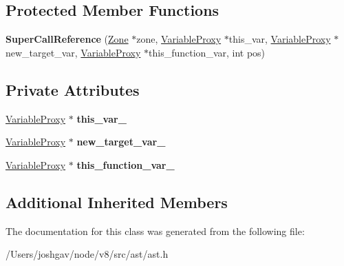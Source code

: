\subsection*{Protected Member Functions}
\begin{DoxyCompactItemize}
\item 
{\bfseries Super\+Call\+Reference} (\hyperlink{classv8_1_1internal_1_1_zone}{Zone} $\ast$zone, \hyperlink{classv8_1_1internal_1_1_variable_proxy}{Variable\+Proxy} $\ast$this\+\_\+var, \hyperlink{classv8_1_1internal_1_1_variable_proxy}{Variable\+Proxy} $\ast$new\+\_\+target\+\_\+var, \hyperlink{classv8_1_1internal_1_1_variable_proxy}{Variable\+Proxy} $\ast$this\+\_\+function\+\_\+var, int pos)\hypertarget{classv8_1_1internal_1_1_super_call_reference_a59f4c1db2045cc7b2ddb5515e7e83388}{}\label{classv8_1_1internal_1_1_super_call_reference_a59f4c1db2045cc7b2ddb5515e7e83388}

\end{DoxyCompactItemize}
\subsection*{Private Attributes}
\begin{DoxyCompactItemize}
\item 
\hyperlink{classv8_1_1internal_1_1_variable_proxy}{Variable\+Proxy} $\ast$ {\bfseries this\+\_\+var\+\_\+}\hypertarget{classv8_1_1internal_1_1_super_call_reference_afd91e3fafe75719582ed1c2f487d72cd}{}\label{classv8_1_1internal_1_1_super_call_reference_afd91e3fafe75719582ed1c2f487d72cd}

\item 
\hyperlink{classv8_1_1internal_1_1_variable_proxy}{Variable\+Proxy} $\ast$ {\bfseries new\+\_\+target\+\_\+var\+\_\+}\hypertarget{classv8_1_1internal_1_1_super_call_reference_ac704d2d1840bcd92e71e7ee82759fd79}{}\label{classv8_1_1internal_1_1_super_call_reference_ac704d2d1840bcd92e71e7ee82759fd79}

\item 
\hyperlink{classv8_1_1internal_1_1_variable_proxy}{Variable\+Proxy} $\ast$ {\bfseries this\+\_\+function\+\_\+var\+\_\+}\hypertarget{classv8_1_1internal_1_1_super_call_reference_a7cc145fd1cde1f2194c754b0767d2efb}{}\label{classv8_1_1internal_1_1_super_call_reference_a7cc145fd1cde1f2194c754b0767d2efb}

\end{DoxyCompactItemize}
\subsection*{Additional Inherited Members}


The documentation for this class was generated from the following file\+:\begin{DoxyCompactItemize}
\item 
/\+Users/joshgav/node/v8/src/ast/ast.\+h\end{DoxyCompactItemize}
